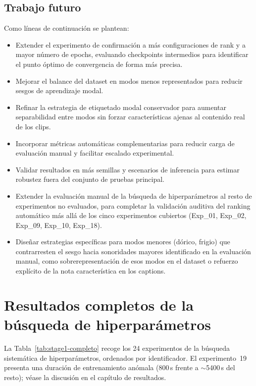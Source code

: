 \documentclass[%
    school=etsisi,%
    type=pfg,%
    degree=61CD,%
]{upm-report}
\begin{document}
\section{Trabajo futuro}

Como l\'ineas de continuaci\'on se plantean:

\begin{itemize}
    \item Extender el experimento de confirmaci\'on a m\'as configuraciones de rank y a mayor n\'umero de epochs, evaluando checkpoints intermedios para identificar el punto \'optimo de convergencia de forma m\'as precisa.
    \item Mejorar el balance del dataset en modos menos representados para reducir sesgos de aprendizaje modal.
    \item Refinar la estrategia de etiquetado modal conservador para aumentar separabilidad entre modos sin forzar caracter\'isticas ajenas al contenido real de los clips.
    \item Incorporar m\'etricas autom\'aticas complementarias para reducir carga de evaluaci\'on manual y facilitar escalado experimental.
    \item Validar resultados en m\'as semillas y escenarios de inferencia para estimar robustez fuera del conjunto de pruebas principal.
    \item Extender la evaluaci\'on manual de la b\'usqueda de hiperpar\'ametros al resto de experimentos no evaluados, para completar la validaci\'on auditiva del ranking autom\'atico m\'as all\'a de los cinco experimentos cubiertos (Exp\_01, Exp\_02, Exp\_09, Exp\_10, Exp\_18).
    \item Dise\~nar estrategias espec\'ificas para modos menores (d\'orico, frigio) que contrarresten el sesgo hacia sonoridades mayores identificado en la evaluaci\'on manual, como sobrerepresentaci\'on de esos modos en el dataset o refuerzo expl\'icito de la nota caracter\'istica en los captions.
\end{itemize}

\appendix

\chapter{Resultados completos de la b\'usqueda de hiperpar\'ametros}
\label{ap:stage1-completo}

La Tabla~\ref{tab:stage1-completo} recoge los 24 experimentos de la b\'usqueda sistem\'atica de hiperpar\'ametros, ordenados por identificador. El experimento~19 presenta una duraci\'on de entrenamiento an\'omala (800\,s frente a ${\sim}$5400\,s del resto); v\'ease la discusi\'on en el cap\'itulo de resultados.
\end{document}
